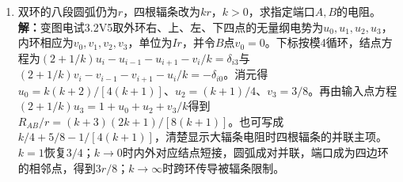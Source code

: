 \documentclass[UTF8,fontset=fandol,a4paper,11pt]{ctexart}
\begin{document}
\begin{enumerate}
\item 双环的八段圆弧仍为$r$，四根辐条改为$kr$，$k>0$，求指定端口$A,B$的电阻。
\textbf{解：}变图电试3.2V5取外环右、上、左、下四点的无量纲电势为$u_0,u_1,u_2,u_3$，内环相应为$v_0,v_1,v_2,v_3$，单位为$Ir$，并令$B$点$v_0=0$。下标按模4循环，结点方程为$(2+1/k)u_i-u_{i-1}-u_{i+1}-v_i/k=\delta_{i3}$与$(2+1/k)v_i-v_{i-1}-v_{i+1}-u_i/k=-\delta_{i0}$。消元得$u_0=k(k+2)/[4(k+1)]$、$u_2=(k+1)/4$、$v_3=3/8$。再由输入点方程$(2+1/k)u_3=1+u_0+u_2+v_3/k$得到$R_{AB}/r=(k+3)(2k+1)/[8(k+1)]$。也可写成$k/4+5/8-1/[4(k+1)]$，清楚显示大辐条电阻时四根辐条的并联主项。$k=1$恢复$3/4$；$k\to0$时内外对应结点短接，圆弧成对并联，端口成为四边环的相邻点，得到$3r/8$；$k\to\infty$时跨环传导被辐条限制。
\begin{center}\begin{minipage}{.98\linewidth}\centering
{}
\end{minipage}
\end{center}
\end{enumerate}
\end{document}
